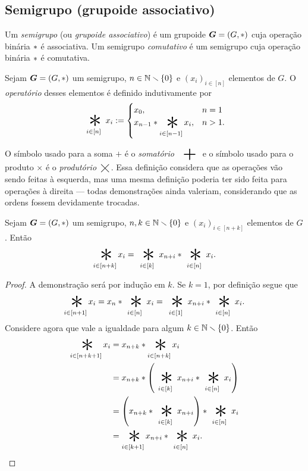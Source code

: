 \subsection{Semigrupo (grupoide associativo)}

\begin{definition}
Um \emph{semigrupo} (ou \emph{grupoide associativo}) é um grupoide $\bm G=(G,\ast)$ cuja operação binária $\ast$ é associativa. Um semigrupo \emph{comutativo} é um semigrupo cuja operação binária $\ast$ é comutativa.
\end{definition}

\begin{definition}
Sejam $\bm G=(G,\ast)$ um semigrupo, $n \in \mathbb{N} \smallsetminus \{0\}$ e $(x_i)_{i \in [n]}$ elementos de $G$. O \emph{operatório} desses elementos é definido indutivamente por
	\begin{equation*}
	\bigopb _{i \in [n]} x_i :=
		\begin{cases}
		x_0, & n=1\\
		x_{n-1} \opb \displaystyle \bigopb_{i \in [n-1]} x_i, & n>1.
		\end{cases}
	\end{equation*}
\end{definition}

O símbolo usado para a soma $+$ é o \emph{somatório} $\displaystyle\bigplus$ e o símbolo usado para o produto $\times$ é o \emph{produtório} $\displaystyle\bigtimes$. Essa definição considera que as operações vão sendo feitas à esquerda, mas uma mesma definição poderia ter sido feita para operações à direita --- todas demonstrações ainda valeriam, considerando que as ordens fossem devidamente trocadas.

\begin{proposition}
Sejam $\bm G=(G,\ast)$ um semigrupo, $n,k \in \mathbb{N} \smallsetminus \{0\}$ e $(x_i)_{i \in [n+k]}$ elementos de $G$. Então
	\begin{equation*}
	\bigopb_{i \in [n+k]} x_i = \bigopb_{i \in [k]} x_{n+i} \opb \bigopb_{i \in [n]} x_i.
	\end{equation*}
\end{proposition}
\begin{proof}
A demonstração será por indução em $k$. Se $k=1$, por definição segue que
	\begin{equation*}
	\bigopb_{i \in [n+1]} x_i = x_{n} \opb \displaystyle \bigopb_{i \in [n]} x_i = \bigopb_{i \in [1]} x_{n+i} \opb \bigopb_{i \in [n]} x_i.
	\end{equation*}
Considere agora que vale a igualdade para algum $k \in \mathbb{N} \smallsetminus \{0\}$. Então
	\begin{align*}
	\bigopb_{i \in [n+k+1]} x_i
		&= x_{n+k} \opb \bigopb_{i \in [n+k]} x_i \\
		&= x_{n+k} \opb \left(\bigopb_{i \in [k]} x_{n+i} \opb \bigopb_{i \in [n]} x_i\right) \\
		&= \left(x_{n+k} \opb \bigopb_{i \in [k]} x_{n+i} \right) \opb \bigopb_{i \in [n]} x_i \\
		&= \bigopb_{i \in [k+1]} x_{n+i} \opb \bigopb_{i \in [n]} x_i. \qedhere
	\end{align*}
\end{proof}

